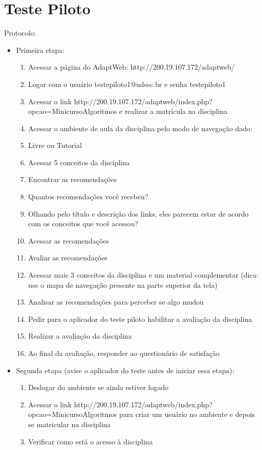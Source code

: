 \chapter{Teste Piloto}\label{ape:teste-piloto}

Protocolo:
\begin{itemize}
  \item Primeira etapa:
  \begin{enumerate}
  \item Acessar a página do AdaptWeb: http://200.19.107.172/adaptweb/
  \item Logar com o usuário testepiloto1@udesc.br e senha testepiloto1
  \item Acessar  o link http://200.19.107.172/adaptweb/index.php?opcao=MinicursoAlgoritmos e realizar a matrícula na disciplina
  \item Acessar o ambiente de aula da disciplina pelo modo de navegação dado:
  \item Livre ou Tutorial
  \item Acessar 5 conceitos da disciplina
  \item Encontrar as recomendações
  \item Quantos recomendações você recebeu?
  \item Olhando pelo título e descrição dos links, eles parecem estar de acordo com os conceitos que você acessou?
  \item Acessar as recomendações
  \item Avaliar as recomendações
  \item Acessar mais 3 conceitos da disciplina e um material complementar (dica: use o mapa de navegação presente na parte superior da tela)
  \item Analisar as recomendações para perceber se algo mudou
  \item Pedir para o aplicador do teste piloto habilitar a avaliação da disciplina
  \item Realizar a avaliação da disciplina
  \item Ao final da avaliação, responder ao questionário de satisfação
  \end{enumerate}

  \item Segunda etapa (avise o aplicador do teste antes de iniciar essa etapa):
  \begin{enumerate}
  \item Deslogar do ambiente se ainda estiver logado
  \item Acessar o link http://200.19.107.172/adaptweb/index.php?opcao=MinicursoAlgoritmos para criar um usuário no ambiente e depois se matricular na disciplina
  \item Verificar como está o acesso à disciplina
  \end{enumerate}
\end{itemize}